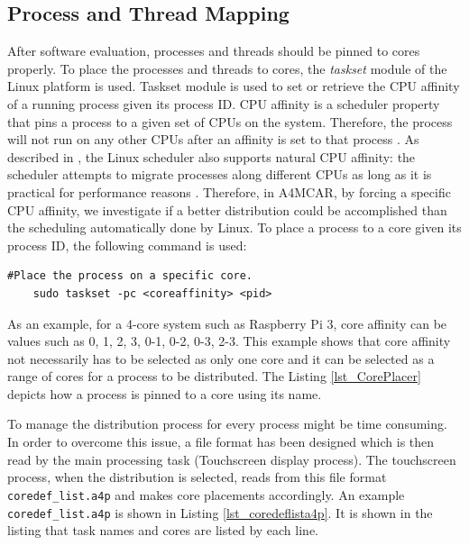 \subsection{Process and Thread Mapping}
After software evaluation, processes and threads should be pinned to cores properly. To place the processes and threads to cores, the \textit{taskset} module of the Linux platform is used. Taskset module \cite{taskset} is used to set or retrieve the CPU affinity of a running process given its process ID. CPU affinity is a scheduler property that pins a process to a given set of CPUs on the system. Therefore, the process will not run on any other CPUs after an affinity is set to that process \cite{taskset}. As described in \cite{taskset}, the Linux scheduler also supports natural CPU affinity: the scheduler attempts to migrate processes along different CPUs as long as it is practical for performance reasons \cite{taskset}. Therefore, in A4MCAR, by forcing a specific CPU affinity, we investigate if a better distribution could be accomplished than the scheduling automatically done by Linux. To place a process to a core given its process ID, the following command is used:

\begin{lstlisting}[style=bash]
	#Place the process on a specific core.
	sudo taskset -pc <coreaffinity> <pid>
\end{lstlisting}

As an example, for a 4-core system such as Raspberry Pi 3, core affinity can be values such as 0, 1, 2, 3, 0-1, 0-2, 0-3, 2-3. This example shows that core affinity not necessarily has to be selected as only one core and it can be selected as a range of cores for a process to be distributed. The Listing \ref{lst_CorePlacer} depicts how a process is pinned to a core using its name.


To manage the distribution process for every process might be time consuming. In order to overcome this issue, a file format has been designed which is then read by the main processing task (Touchscreen display process). The touchscreen process, when the distribution is selected, reads from this file format \texttt{coredef\texttt{\_}list.a4p} and makes core placements accordingly. An example \texttt{coredef\texttt{\_}list.a4p} is shown in Listing \ref{lst_coredeflista4p}. It is shown in the listing that task names and cores are listed by each line.



